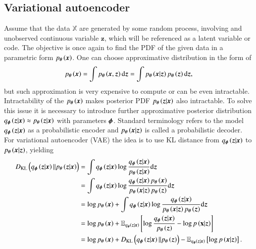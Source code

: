 \subsection{Variational autoencoder}
Assume that the data $\mathbb{X}$ are generated by some random process, involving and unobserved continuous variable $\boldsymbol{z}$, which will be referenced as a latent variable or code. The objective is once again to find the PDF of the given data in a parametric form $p_{\boldsymbol{\theta}}\left(\boldsymbol{x}\right)$. One can choose approximative distribution in the form of
\begin{equation}
p_{\boldsymbol{\theta}}\left(\boldsymbol{x}\right) = \int p_{\boldsymbol{\theta}}\left(\boldsymbol{x},  \boldsymbol{z}\right)\mathrm{d}{\boldsymbol{z}} =\int p_{\boldsymbol{\theta}}\left(\boldsymbol{x}\vert \boldsymbol{z}\right)p_{\boldsymbol{\theta}}\left(\boldsymbol{z}\right)\mathrm{d}{\boldsymbol{z}},
\end{equation}
but such approximation is very expensive to compute or can be even intractable. Intractability of the $p_{\boldsymbol{\theta}}\left(\boldsymbol{x}\right)$ makes posterior PDF $p_{\boldsymbol{\theta}}\left(\boldsymbol{z}\vert\boldsymbol{x}\right)$ also intractable. To solve this issue it is necessary to introduce further approximative posterior distribution $q_{\boldsymbol{\phi}}\left(\boldsymbol{z}\vert\boldsymbol{x}\right) \approx p_{\boldsymbol{\theta}}\left(\boldsymbol{z}\vert\boldsymbol{x}\right)$ with parameters $\boldsymbol{\phi}$. Standard terminology refers to the model $q_{\boldsymbol{\phi}}\left(\boldsymbol{z}\vert\boldsymbol{x}\right)$ as a probabilistic encoder and  $p_{\boldsymbol{\theta}}\left(\boldsymbol{x}\vert \boldsymbol{z}\right)$ is called a probabilistic decoder.
For variational autoencoder (VAE) the idea is to use KL distance from $q_{\boldsymbol{\phi}}\left(\boldsymbol{z}\vert\boldsymbol{x}\right)$ to $p_{\boldsymbol{\theta}}\left(\boldsymbol{x}\vert \boldsymbol{z}\right)$, yielding
\begin{equation}\label{eq:VAEloss}
\begin{split}
D_{\mathrm{KL}}\left(q_{\boldsymbol{\phi}}\left(\boldsymbol{z}\vert \boldsymbol{x} \right) \Vert p_{\boldsymbol{\theta}}\left(\boldsymbol{z}\vert \boldsymbol{x}\right)\right) & = 
\int q_{\boldsymbol{\phi}}\left(\boldsymbol{z}\vert \boldsymbol{x} \right) \log \frac{q_{\boldsymbol{\phi}}\left(\boldsymbol{z}\vert \boldsymbol{x} \right)}{p_{\boldsymbol{\theta}}\left(\boldsymbol{z}\vert \boldsymbol{x}\right)} \mathrm{d}{\boldsymbol{z}} \\
& =  \int q_{\boldsymbol{\phi}}\left(\boldsymbol{z}\vert \boldsymbol{x} \right) \log \frac{q_{\boldsymbol{\phi}}\left(\boldsymbol{z}\vert \boldsymbol{x} \right)p_{\boldsymbol{\theta}}\left(\boldsymbol{x}\right)}{p_{\boldsymbol{\theta}}\left(\boldsymbol{x} \vert \boldsymbol{z}\right) p_{\boldsymbol{\theta}}\left(\boldsymbol{z}\right)} \mathrm{d}{\boldsymbol{z}} \\
& = \log p_{\boldsymbol{\theta}}\left(\boldsymbol{x}\right) +  \int q_{\boldsymbol{\phi}}\left(\boldsymbol{z}\vert \boldsymbol{x} \right) \log \frac{q_{\boldsymbol{\phi}}\left(\boldsymbol{z}\vert \boldsymbol{x} \right)}{p_{\boldsymbol{\theta}}\left(\boldsymbol{x} \vert \boldsymbol{z}\right)p_{\boldsymbol{\theta}}\left(\boldsymbol{z}\right) } \mathrm{d}{\boldsymbol{z}} \\
& = \log p_{\boldsymbol{\theta}}\left(\boldsymbol{x}\right) +  \mathbb{E}_{q_{\boldsymbol{\phi}}\left(\boldsymbol{z}\vert \boldsymbol{x} \right)}\left[\log\frac{q_{\boldsymbol{\phi}}\left(\boldsymbol{z}\vert \boldsymbol{x} \right)}{p_{\boldsymbol{\theta}}\left(\boldsymbol{z}\right)} - \log p\left(\textbf{x}\vert \boldsymbol{z}\right)\right]\\
    & = \log p_{\boldsymbol{\theta}}\left(\boldsymbol{x}\right) +D_{\mathrm{KL}} \left(q_{\boldsymbol{\phi}}\left(\boldsymbol{z}\vert \boldsymbol{x} \right) \Vert p_{\boldsymbol{\theta}}\left(\boldsymbol{z}\right) \right) -  \mathbb{E}_{q_{\boldsymbol{\phi}}\left(\boldsymbol{z}\vert \boldsymbol{x} \right)}\left[\log p\left(\boldsymbol{x}\vert \boldsymbol{z}\right)\right].
 \end{split}
\end{equation}
